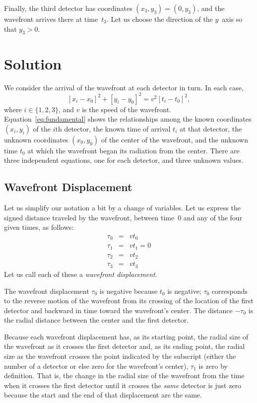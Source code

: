\documentclass[twocolumn]{article}
\begin{document}
Finally, the third detector has coordinates $(x_3, y_3) = (0, y_3)$, and the
wavefront arrives there at time~$t_3$.  Let us choose the direction of the
$y$~axis so that $y_3 > 0$.

\section{Solution}

We consider the arrival of the wavefront at each detector in turn.  In each
case,
\begin{equation}
   \left[x_i - x_0\right]^2 + \left[y_i - y_0\right]^2 = v^2 \left[t_i -
   t_0\right]^2,
   \label{eq:fundamental}
\end{equation}
where $i \in \{1, 2, 3\}$, and $v$ is the speed of the wavefront.
Equation~\ref{eq:fundamental} shows the relationships among the known
coordinates $(x_i, y_i)$ of the $i$th detector, the known time of arrival $t_i$
at that detector, the unknown coordinates $(x_0, y_0)$ of the center of the
wavefront, and the unknown time $t_0$ at which the wavefront began its
radiation from the center.  There are three independent equations, one for each
detector, and three unknown values.

\subsection{Wavefront Displacement}

Let us simplify our notation a bit by a change of variables.  Let us express
the signed distance traveled by the wavefront, between time~0 and any of the
four given times, as follows:
\begin{eqnarray}
   \tau_0 &=& vt_0\\
   \tau_1 &=& vt_1 = 0\\
   \tau_2 &=& vt_2\\
   \tau_3 &=& vt_3
\end{eqnarray}
Let us call each of these a \emph{wavefront displacement}.

The wavefront displacement $\tau_0$ is negative because $t_0$ is negative;
$\tau_0$ corresponds to the reverse motion of the wavefront from its crossing
of the location of the first detector and backward in time toward the
wavefront's center.  The distance $-\tau_0$ is the radial distance between the
center and the first detector.

Because each wavefront displacement has, as its starting point, the radial size
of the wavefront as it crosses the first detector and, as its ending point, the
radial size as the wavefront crosses the point indicated by the subscript
(either the number of a detector or else zero for the wavefront's center),
$\tau_1$ is zero by definition.  That is, the change in the radial size of the
wavefront from the time when it crosses the first detector until it crosses the
\emph{same} detector is just zero because the start and the end of that
displacement are the same.
\end{document}
